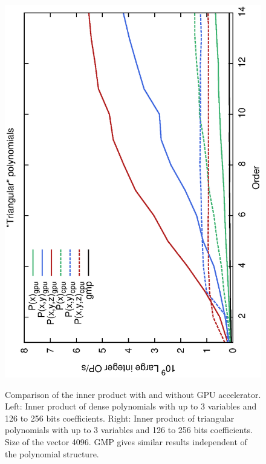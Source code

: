 \documentclass[oribibl,a4paper]{llncs2e/llncs}
\begin{document}
\begin{itemize}
\begin{figure}[t!]
{        \hspace{-0.4cm}
        \includegraphics[scale=0.37, angle=-90]{MC128.eps} 
    }
    \caption{Comparison of the inner product with and without GPU accelerator. Left: Inner product of dense polynomials with up to 3 variables and 126 to 256 bits coefficients. Right: Inner product of triangular polynomials with up to 3 variables and 126 to 256 bits coefficients. Size of the vector 4096. GMP gives similar results independent of the polynomial structure.}
    \label{fig:performance_large_int_ops}
\end{figure}


\end{itemize}
\end{document}
